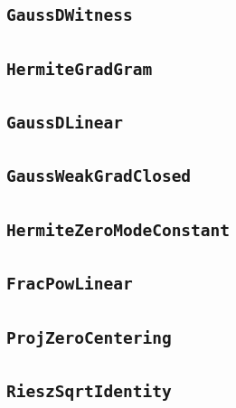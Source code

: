 \documentclass[11pt]{amsart}
\theoremstyle{definition}
\begin{document}
\subsection{\texorpdfstring{\texttt{GaussDWitness}}{GaussDWitness}}\label{node:GaussDWitness}


\subsection{\texorpdfstring{\texttt{HermiteGradGram}}{HermiteGradGram}}\label{node:HermiteGradGram}


\subsection{\texorpdfstring{\texttt{GaussDLinear}}{GaussDLinear}}\label{node:GaussDLinear}


\subsection{\texorpdfstring{\texttt{GaussWeakGradClosed}}{GaussWeakGradClosed}}\label{node:GaussWeakGradClosed}


\subsection{\texorpdfstring{\texttt{HermiteZeroModeConstant}}{HermiteZeroModeConstant}}\label{node:HermiteZeroModeConstant}


\subsection{\texorpdfstring{\texttt{FracPowLinear}}{FracPowLinear}}\label{node:FracPowLinear}


\subsection{\texorpdfstring{\texttt{ProjZeroCentering}}{ProjZeroCentering}}\label{node:ProjZeroCentering}


\subsection{\texorpdfstring{\texttt{RieszSqrtIdentity}}{RieszSqrtIdentity}}\label{node:RieszSqrtIdentity}

\end{document}
